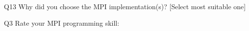 \begin{description}%
\item{Q13} Why did you choose the MPI implementation(s)? [Select most suitable one]%
\item{Q3} Rate your MPI programming skill:%
\end{description}%
